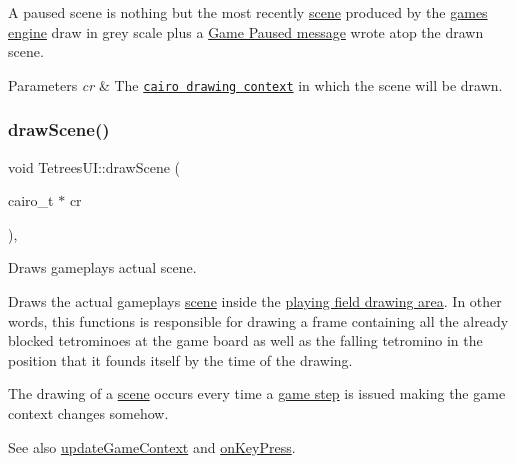 A paused scene is nothing but the most recently \hyperlink{classTetreesEngine_aeade477c0bc2eaaa894ebbdaca93584e}{scene} produced by the \hyperlink{classTetreesUI_a07faa56ea40b28beba7509fa7f65c897}{game\textquotesingle{}s engine} draw in grey scale plus a \hyperlink{TetreesStrings_8hpp_a338b3837bdd505145f52cff93b53e18a}{Game Paused message} wrote atop the drawn scene. 
\begin{DoxyParams}{Parameters}
{\em cr} & The \href{https://www.cairographics.org/manual/cairo-cairo-t.html}{\tt cairo drawing context} in which the scene will be drawn. \\
\hline
\end{DoxyParams}
\mbox{\label{classTetreesUI_a357ae7240cc5f35b5d61244e7a6bcfe3}} 
\subsubsection{\texorpdfstring{draw\+Scene()}{drawScene()}}
{\footnotesize\ttfamily void Tetrees\+U\+I\+::draw\+Scene (\begin{DoxyParamCaption}\item[{cairo\+\_\+t $\ast$}]{cr }\end{DoxyParamCaption})\hspace{0.3cm}{\ttfamily [static]}, {\ttfamily [private]}}



Draws gameplay\textquotesingle{}s actual scene. 

Draws the actual gameplay\textquotesingle{}s \hyperlink{classTetreesUI_a604cf4cecdbc93745eaf7733b3c33602}{scene} inside the \hyperlink{TetreesUI_8cpp_af900bffe25b932fb86dc61cfdf839e95}{playing field drawing area}. In other words, this functions is responsible for drawing a frame containing all the already blocked tetrominoes at the game board as well as the falling tetromino in the position that it founds itself by the time of the drawing.

The drawing of a \hyperlink{classTetreesUI_a604cf4cecdbc93745eaf7733b3c33602}{scene} occurs every time a \hyperlink{classTetreesEngine_a33e9983a618b3538640b6bd987304b8b}{game step} is issued making the game context changes somehow. \begin{DoxySeeAlso}{See also}
\hyperlink{classTetreesUI_a0fe8ccb5c1c594792591036f4f02175f}{update\+Game\+Context} and \hyperlink{classTetreesUI_ad940ec71d761d3234ee3cef397434784}{on\+Key\+Press}. 
\end{DoxySeeAlso}

